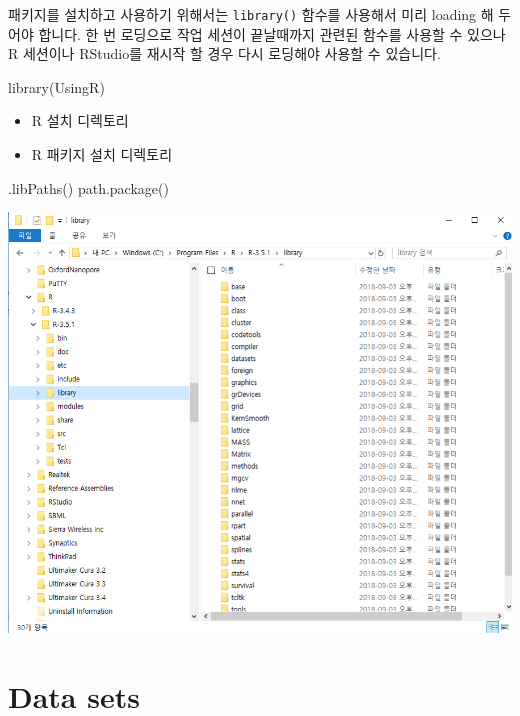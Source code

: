 \documentclass[
]{book}
\newenvironment{Shaded}{\begin{snugshade}}{\end{snugshade}}
\newcommand{\FunctionTok}[1]{\textcolor[rgb]{0.00,0.00,0.00}{#1}}
\newcommand{\NormalTok}[1]{#1}
\providecommand{\tightlist}{%
  \setlength{\itemsep}{0pt}\setlength{\parskip}{0pt}}
\begin{document}
패키지를 설치하고 사용하기 위해서는 \texttt{library()} 함수를 사용해서 미리 loading 해 두어야 합니다. 한 번 로딩으로 작업 세션이 끝날때까지 관련된 함수를 사용할 수 있으나 R 세션이나 RStudio를 재시작 할 경우 다시 로딩해야 사용할 수 있습니다.

\begin{Shaded}
\begin{Highlighting}[]
\FunctionTok{library}\NormalTok{(UsingR)}
\end{Highlighting}
\end{Shaded}

\begin{itemize}
\tightlist
\item
  R 설치 디렉토리
\item
  R 패키지 설치 디렉토리
\end{itemize}

\begin{Shaded}
\begin{Highlighting}[]
\FunctionTok{.libPaths}\NormalTok{()}
\FunctionTok{path.package}\NormalTok{()}
\end{Highlighting}
\end{Shaded}

\includegraphics{images/01/01-20.png}

\hypertarget{data-sets}{%
\section{Data sets}\label{data-sets}}
\end{document}
